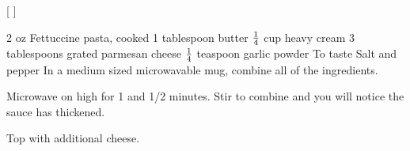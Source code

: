 
[
]

\begin{step}
2 oz Fettuccine pasta, cooked
1 tablespoon butter
$\frac{1}{4}$ cup heavy cream
3 tablespoons grated parmesan cheese
$\frac{1}{4}$ teaspoon garlic powder
To taste Salt and pepper
\method
In a medium sized microwavable mug, combine all of the ingredients.

Microwave on high for 1 and 1/2 minutes. Stir to combine and you will notice the sauce has thickened.

Top with additional cheese.
\end{step}